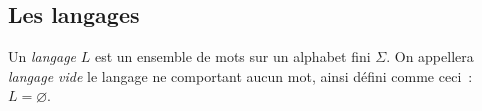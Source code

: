 





\subsection{Les langages}

\begin{definition}
    Un \textit{langage} \(L\) est un ensemble de mots sur un alphabet fini
    \(\Sigma\). On appellera \textit{langage vide} le langage ne comportant
    aucun mot, ainsi défini comme ceci~: \(L = \varnothing\).
\end{definition}

